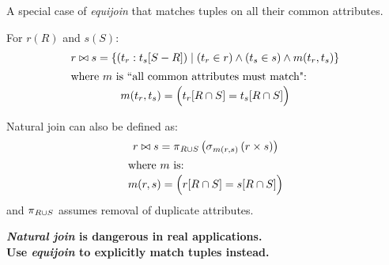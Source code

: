\begin{multicols}{2}
\begin{CheatsheetEntryFrame}
    \end{CheatsheetEntryFrame}
    
    \begin{CheatsheetEntryFrame}


        A special case of \textit{equijoin} that matches tuples on all their common attributes.

        For $r(R)$ and $s(S)$:
        \begin{gather*}
            r \bowtie s = \setdef{\parens*{t_r : t_s[S - R]}}{(t_r \in r) \wedge (t_s \in s) \wedge m(t_r, t_s)} \\
            \intertext{where $m$ is ``all common attributes must match":}
            m(t_r, t_s) = \parens*{\vphantom{\frac{x}{x}} t_r[R \cap S] = t_s[R \cap S]} %
        \end{gather*}

        Natural join can also be defined as:
        \begin{gather*}
            r \bowtie s = \relproject_{R \cup S}{\parens*{\relselect_{m(r, s)}{\parens*{r \times s}}}} \\
            \intertext{where $m$ is:}
            m(r, s) = \parens*{\vphantom{\frac{x}{x}} r[R \cap S] = s[R \cap S]} %
        \end{gather*}
        and $\operatorname{\pi}_{R \cup S}$ assumes removal of duplicate attributes.

        \vspace{\TextExtraSkip}%
        \textbf{\color{mycontrastred}
            \textit{Natural join} is dangerous in real applications.\\[0mm]
            Use \textit{equijoin} to explicitly match tuples instead.
        }


\end{CheatsheetEntryFrame}
\end{multicols}
